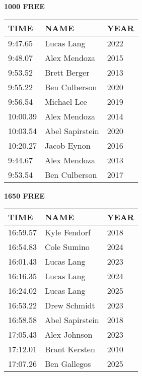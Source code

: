 \begin{minipage}[t]{0.48\textwidth}
\centering
\textbf{1000 FREE}\\[0.05cm]
\begin{tabular}{@{}p{1.8cm}p{2.8cm}p{1.2cm}@{}}
\hline
\textbf{TIME} & \textbf{NAME} & \textbf{YEAR} \\
\hline
9:47.65 & Lucas Lang & 2022 \\
9:48.07 & Alex Mendoza & 2015 \\
9:53.52 & Brett Berger & 2013 \\
9:55.22 & Ben Culberson & 2020 \\
9:56.54 & Michael Lee & 2019 \\
10:00.39 & Alex Mendoza & 2014 \\
10:03.54 & Abel Sapirstein & 2020 \\
10:20.27 & Jacob Eynon & 2016 \\
9:44.67 & Alex Mendoza & 2013 \\
9:53.54 & Ben Culberson & 2017 \\
\hline
\end{tabular}
\end{minipage}\hfill
\begin{minipage}[t]{0.48\textwidth}
\centering
\textbf{1650 FREE}\\[0.05cm]
\begin{tabular}{@{}p{1.8cm}p{2.8cm}p{1.2cm}@{}}
\hline
\textbf{TIME} & \textbf{NAME} & \textbf{YEAR} \\
\hline
16:59.57 & Kyle Fendorf & 2018 \\
16:54.83 & Cole Sumino & 2024 \\
16:01.43 & Lucas Lang & 2023 \\
16:16.35 & Lucas Lang & 2024 \\
16:24.02 & Lucas Lang & 2025 \\
16:53.22 & Drew Schmidt & 2023 \\
16:58.58 & Abel Sapirstein & 2018 \\
17:05.43 & Alex Johnson & 2023 \\
17:12.01 & Brant Kersten & 2010 \\
17:07.26 & Ben Gallegos & 2025 \\
\hline
\end{tabular}
\end{minipage}

\vspace{0.4cm}

